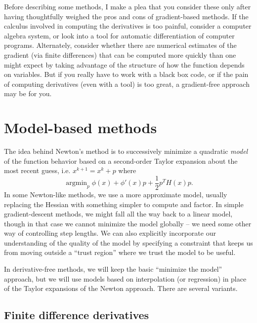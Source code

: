 \documentclass[12pt, leqno]{article} %
\begin{document}
Before describing some methods, I make a plea that you consider
these only after having thoughtfully weighed the pros and cons of
gradient-based methods.  If the calculus involved in computing
the derivatives is too painful, consider a computer algebra system,
or look into a tool for automatic differentiation of computer
programs.  Alternately, consider whether there are numerical estimates
of the gradient (via finite differences) that can be computed more
quickly than one might expect by taking advantage of the structure
of how the function depends on variables.  But if you really have to
work with a black box code, or if the pain of computing derivatives
(even with a tool) is too great, a gradient-free approach may be for you.

\section*{Model-based methods}

The idea behind Newton's method is to successively minimize a
quadratic {\em model} of the function behavior based on a second-order
Taylor expansion about the most recent guess, i.e. $x^{k+1} = x^k + p$
where
\[
  \operatorname{argmin}_{p} \phi(x) + \phi'(x) p + \frac{1}{2} p^T H(x) p.
\]
In some Newton-like methods, we use a more approximate model, usually
replacing the Hessian with something simpler to compute and factor.
In simple gradient-descent methods, we might fall all the way back to
a linear model, though in that case we cannot minimize the model
globally -- we need some other way of controlling step lengths.
We can also explicitly incorporate our understanding of the quality of
the model by specifying a constraint that keeps us from moving outside
a ``trust region'' where we trust the model to be useful.

In derivative-free methods, we will keep the basic ``minimize the
model'' approach, but we will use models based on interpolation
(or regression) in place of the Taylor expansions of the Newton
approach.  There are several variants.

\subsection*{Finite difference derivatives}
\end{document}
